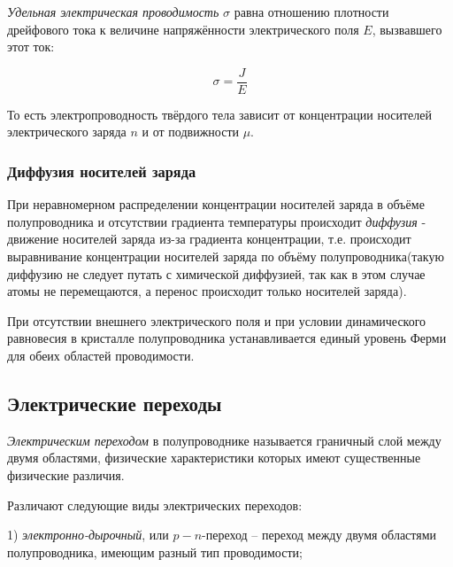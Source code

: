     \par \textit{Удельная электрическая проводимость} $\sigma$ равна отношению плотности дрейфового тока к величине напряжённости электрического поля \(E\), вызвавшего этот ток:  
    
    \begin{equation}
    	\sigma = \dfrac{J}{E}
    \end{equation}
    
    \par То есть электропроводность твёрдого тела зависит от концентрации носителей электрического заряда \(n\) и от подвижности \(\mu\).
    
    \subsubsection{Диффузия носителей заряда}
    
    \par При неравномерном распределении концентрации носителей заряда в объёме полупроводника и отсутствии градиента температуры происходит \textit{диффузия} - движение носителей заряда из-за градиента концентрации, т.е. происходит выравнивание концентрации носителей заряда по объёму полупроводника(такую диффузию не следует путать с химической диффузией, так как в этом случае атомы не перемещаются, а перенос происходит только носителей заряда).
    
    \par При отсутствии внешнего электрического поля и при условии динамического равновесия в кристалле полупроводника устанавливается единый уровень Ферми для обеих областей проводимости.
    
    \clearpage

	\subsection{Электрические переходы}
	
	\par \textit{Электрическим переходом} в полупроводнике называется граничный слой между двумя областями, физические характеристики которых имеют существенные физические различия.
	
	\par Различают следующие виды электрических переходов:
	
	\par 1) \textit{электронно-дырочный}, или \(p-n\)-переход -- переход между двумя областями полупроводника, имеющим разный тип проводимости;
	
